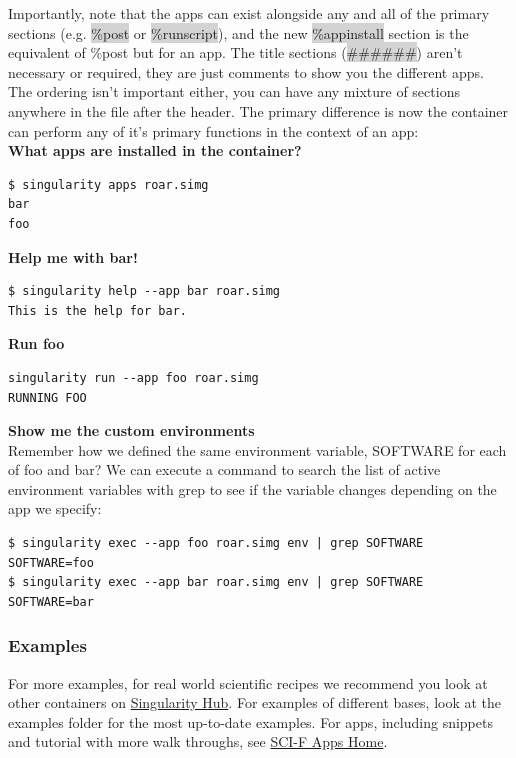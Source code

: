 \documentclass[a4paper]{article}
\begin{document}
Importantly, note that the apps can exist alongside any and all of the primary sections (e.g. \colorbox{lightgray}{\%post} or \colorbox{lightgray}{\%runscript}), and the new \colorbox{lightgray}{\%appinstall} section is the equivalent of \%post but for an app. The title sections (\colorbox{lightgray}{\#\#\#\#\#\#}) aren’t necessary or required, they are just comments to show you the different apps. The ordering isn’t important either, you can have any mixture of sections anywhere in the file after the header. The primary difference is now the container can perform any of it’s primary functions in the context of an app:\\[0.1in]

\textbf{What apps are installed in the container?}

\begin{lstlisting}[frame=single]  
$ singularity apps roar.simg 
bar
foo
\end{lstlisting}

\textbf{Help me with bar!}

\begin{lstlisting}[frame=single]  
$ singularity help --app bar roar.simg
This is the help for bar.
\end{lstlisting}

\textbf{Run foo}
\begin{lstlisting}[frame=single]  
singularity run --app foo roar.simg 
RUNNING FOO
\end{lstlisting}


\textbf{Show me the custom environments}\\[0.1in]

Remember how we defined the same environment variable, SOFTWARE for each of foo and bar? We can execute a command to search the list of active environment variables with grep to see if the variable changes depending on the app we specify:

\begin{lstlisting}[frame=single]  
$ singularity exec --app foo roar.simg env | grep SOFTWARE
SOFTWARE=foo
$ singularity exec --app bar roar.simg env | grep SOFTWARE
SOFTWARE=bar
\end{lstlisting}

\subsubsection{Examples}

For more examples, for real world scientific recipes we recommend you look at other containers on  \href{https://singularity-hub.org/}{Singularity Hub}. For examples of different bases, look at the examples folder for the most up-to-date examples. For apps, including snippets and tutorial with more walk throughs, see \href{https://sci-f.github.io/}{SCI-F Apps Home}.\\[0.1in]
\end{document}
